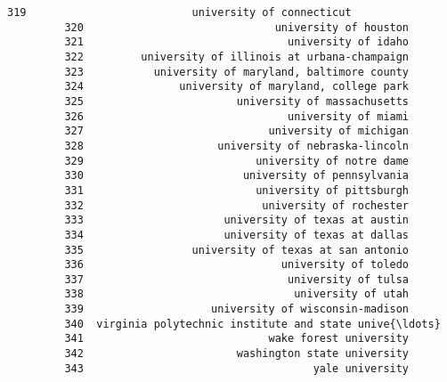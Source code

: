 \documentclass[11pt]{article}
\begin{document}
\begin{Verbatim}[commandchars=\\\{\}]
         319                          university of connecticut   
         320                              university of houston   
         321                                university of idaho   
         322         university of illinois at urbana-champaign   
         323           university of maryland, baltimore county   
         324               university of maryland, college park   
         325                        university of massachusetts   
         326                                university of miami   
         327                             university of michigan   
         328                     university of nebraska-lincoln   
         329                           university of notre dame   
         330                         university of pennsylvania   
         331                           university of pittsburgh   
         332                            university of rochester   
         333                      university of texas at austin   
         334                      university of texas at dallas   
         335                 university of texas at san antonio   
         336                               university of toledo   
         337                                university of tulsa   
         338                                 university of utah   
         339                    university of wisconsin-madison   
         340  virginia polytechnic institute and state unive{\ldots}   
         341                             wake forest university   
         342                        washington state university   
         343                                    yale university   
         

\end{Verbatim}
\end{document}
